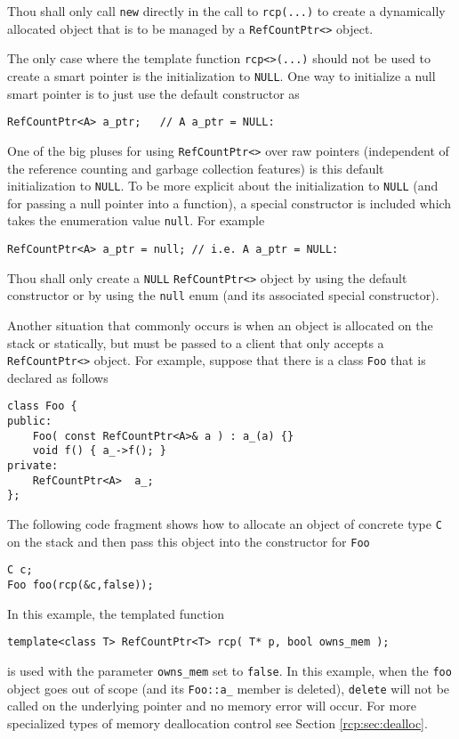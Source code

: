 \begin{commandment}\label{rcp:cmd:rcp-new}
Thou shall only call {}\texttt{new} directly
in the call to {}\texttt{rcp(...)} to create a dynamically allocated
object that is to be managed by a {}\texttt{RefCountPtr<>} object.
\end{commandment}

The only case where the template function {}\texttt{rcp<>(...)} should
not be used to create a smart pointer is the initialization to
{}\texttt{NULL}.  One way to initialize a null smart pointer is to just
use the default constructor as
%
{\scriptsize\begin{verbatim}
RefCountPtr<A> a_ptr;   // A a_ptr = NULL:
\end{verbatim}}
%
One of the big pluses for using {}\texttt{RefCountPtr<>} over raw
pointers (independent of the reference counting and garbage collection
features) is this default initialization to {}\texttt{NULL}.
To be more explicit about the initialization to {}\texttt{NULL} (and for
passing a null pointer into a function), a special constructor is
included which takes the enumeration value {}\texttt{null}.  For example
%
{\scriptsize\begin{verbatim}
RefCountPtr<A> a_ptr = null; // i.e. A a_ptr = NULL:
\end{verbatim}}
%

\begin{commandment}
Thou shall only create a {}\texttt{NULL}
{}\texttt{RefCountPtr<>} object by using the default constructor
or by using the {}\texttt{null} enum (and its associated special
constructor).
\end{commandment}

Another situation that commonly occurs is when an object is allocated
on the stack or statically, but must be passed to a client that only
accepts a {}\texttt{RefCountPtr<>} object.  For example, suppose that
there is a class {}\texttt{Foo} that is declared as follows
%
{\scriptsize\begin{verbatim}
class Foo {
public:
    Foo( const RefCountPtr<A>& a ) : a_(a) {}
    void f() { a_->f(); }
private:
    RefCountPtr<A>  a_;
};
\end{verbatim}}
%
The following code fragment shows how to allocate an object of concrete
type {}\texttt{C} on the stack and then pass this object into the constructor
for {}\texttt{Foo}
%
{\scriptsize\begin{verbatim}
C c;
Foo foo(rcp(&c,false));
\end{verbatim}}
%
In this example, the templated function
%
{\scriptsize\begin{verbatim}
template<class T> RefCountPtr<T> rcp( T* p, bool owns_mem );
\end{verbatim}}
%
\noindent{}
is used with the parameter {}\texttt{owns\_mem} set to
{}\texttt{false}.  In this example, when the {}\texttt{foo} object
goes out of scope (and its {}\texttt{Foo::a\_} member is deleted),
{}\texttt{delete} will not be called on the underlying pointer and no
memory error will occur.  For more specialized types of memory
deallocation control see Section {}\ref{rcp:sec:dealloc}.

